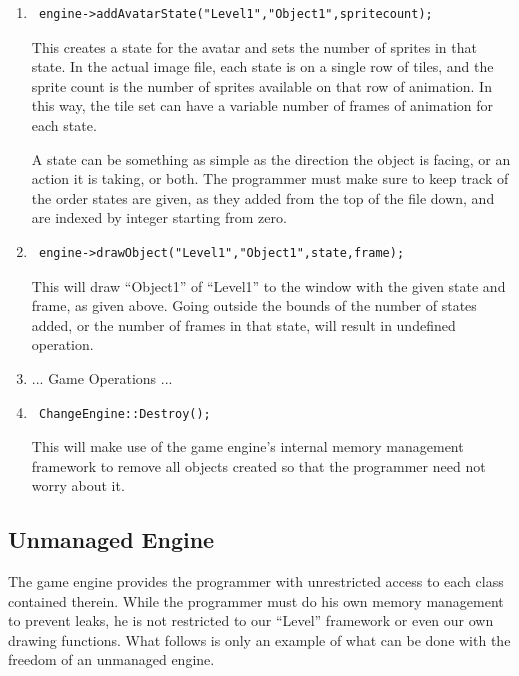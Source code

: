 \documentclass[12pt]{article}
\begin{document}
\begin{enumerate}
 \item \begin{verbatim} engine->addAvatarState("Level1","Object1",spritecount); \end{verbatim}
This creates a state for the avatar and sets the number of sprites in that state. In the actual image file, each state is on a single row of tiles, and the sprite count is the number of sprites available on that row of animation. In this way, the tile set can have a variable number of frames of animation for each state.

A state can be something as simple as the direction the object is facing, or an action it is taking, or both. The programmer must make sure to keep track of the order states are given, as they added from the top of the file down, and are indexed by integer starting from zero.
 \item \begin{verbatim} engine->drawObject("Level1","Object1",state,frame); \end{verbatim}
This will draw ``Object1'' of ``Level1'' to the window with the given state and frame, as given above. Going outside the bounds of the number of states added, or the number of frames in that state, will result in undefined operation.
 \item ... Game Operations ...
 \item \begin{verbatim} ChangeEngine::Destroy(); \end{verbatim}
This will make use of the game engine's internal memory management framework to remove all objects created so that the programmer need not worry about it.
\end{enumerate}

\subsection{Unmanaged Engine}
The game engine provides the programmer with unrestricted access to each class contained therein. While the programmer must do his own memory management to prevent leaks, he is not restricted to our ``Level'' framework or even our own drawing functions. What follows is only an example of what can be done with the freedom of an unmanaged engine.
\end{document}
